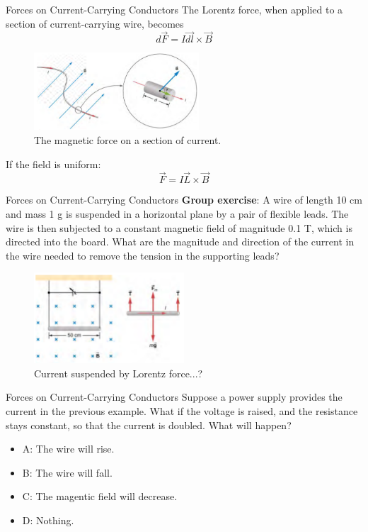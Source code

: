 \documentclass{beamer}
\begin{document}
\begin{frame}{Forces on Current-Carrying Conductors}
The Lorentz force, when applied to a section of current-carrying wire, becomes
\begin{equation}
d\vec{F} = I \vec{dl} \times \vec{B}
\end{equation}
\begin{figure}
\centering
\includegraphics[width=0.55\textwidth]{figures/current.png}
\caption{\label{fig:current} The magnetic force on a section of current.}
\end{figure}
If the field is uniform:
\begin{equation}
\vec{F} = I \vec{L} \times \vec{B}
\end{equation}
\end{frame}

\begin{frame}{Forces on Current-Carrying Conductors}
\small
\textbf{Group exercise}: A wire of length 10 cm and mass 1 g is suspended in a horizontal plane by a pair of flexible leads.  The wire is then subjected to a constant magnetic field of magnitude 0.1 T, which is directed into the board.  What are the magnitude and direction of the current in the wire needed to remove the tension in the supporting leads?
\begin{figure}
\centering
\includegraphics[width=0.5\textwidth]{figures/leads.png}
\caption{\label{fig:leads} Current suspended by Lorentz force...?}
\end{figure}
\end{frame}

\begin{frame}{Forces on Current-Carrying Conductors}
Suppose a power supply provides the current in the previous example.  What if the voltage is raised, and the resistance stays constant, so that the current is doubled.  What will happen?
\begin{itemize}
\item A: The wire will rise.
\item B: The wire will fall.
\item C: The magentic field will decrease.
\item D: Nothing.
\end{itemize}
\end{frame}
\end{document}

